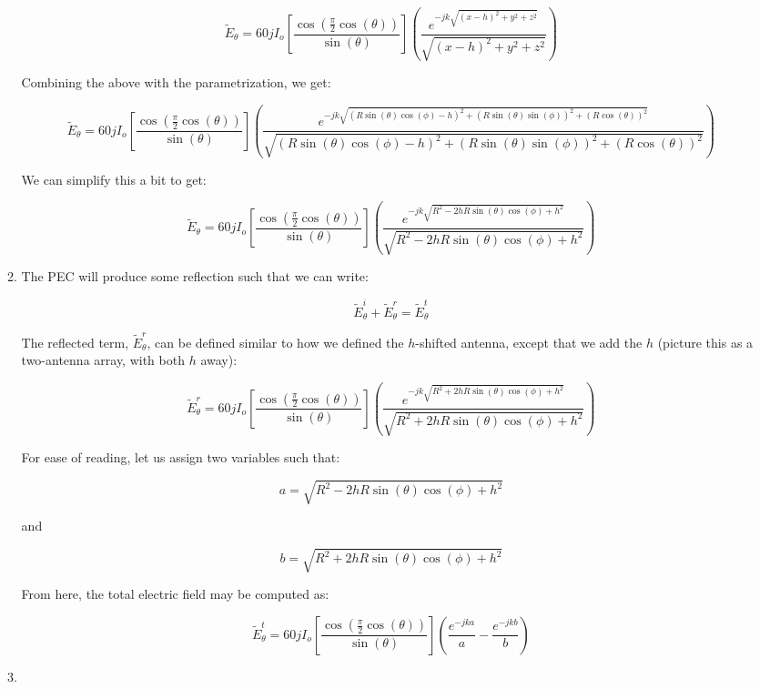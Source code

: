 \begin{enumerate}
\begin{enumerate}
        $$\tilde{E}_\theta=60jI_o\left[ \frac{\cos\left( \frac{\pi}{2}\cos(\theta) \right)}{\sin(\theta)} \right]\left( \frac{e^{-jk\sqrt{(x-h)^2+y^2+z^2}}}{\sqrt{(x-h)^2+y^2+z^2}} \right)$$

        Combining the above with the parametrization, we get:

        $$\tilde{E}_\theta=60jI_o\left[ \frac{\cos\left( \frac{\pi}{2}\cos(\theta) \right)}{\sin(\theta)} \right]\left( \frac{e^{-jk\sqrt{(R\sin(\theta)\cos(\phi)-h)^2+(R\sin(\theta)\sin(\phi))^2+(R\cos(\theta))^2}}}{\sqrt{(R\sin(\theta)\cos(\phi)-h)^2+(R\sin(\theta)\sin(\phi))^2+(R\cos(\theta))^2}} \right)$$

        We can simplify this a bit to get:

        $$\boxed{\tilde{E}_\theta=60jI_o\left[ \frac{\cos\left( \frac{\pi}{2}\cos(\theta) \right)}{\sin(\theta)} \right]\left( \frac{e^{-jk\sqrt{R^2-2hR\sin(\theta)\cos(\phi)+h^2}}}{\sqrt{R^2-2hR\sin(\theta)\cos(\phi)+h^2}} \right)}$$

      \item 

        The PEC will produce some reflection such that we can write:

        $$\tilde{E}_\theta^i+\tilde{E}_\theta^r=\tilde{E}_\theta^t$$

        The reflected term, $\tilde{E}_\theta^r$, can be defined similar to how we defined the $h$-shifted antenna, except that we add the $h$ (picture this as a two-antenna array, with both $h$ away):

        $$\tilde{E}_\theta^r=60jI_o\left[ \frac{\cos\left( \frac{\pi}{2}\cos(\theta) \right)}{\sin(\theta)} \right]\left( \frac{e^{-jk\sqrt{R^2+2hR\sin(\theta)\cos(\phi)+h^2}}}{\sqrt{R^2+2hR\sin(\theta)\cos(\phi)+h^2}} \right)$$

        For ease of reading, let us assign two variables such that:

        $$a=\sqrt{R^2-2hR\sin(\theta)\cos(\phi)+h^2}$$

        and 

        $$b=\sqrt{R^2+2hR\sin(\theta)\cos(\phi)+h^2}$$

        From here, the total electric field may be computed as:

        $$\boxed{\tilde{E}_\theta^t=60jI_o\left[ \frac{\cos\left( \frac{\pi}{2}\cos(\theta) \right)}{\sin(\theta)} \right]\left( \frac{e^{-jka}}{a}-\frac{e^{-jkb}}{b} \right)}$$

      \item 


\end{enumerate}
\end{enumerate}
